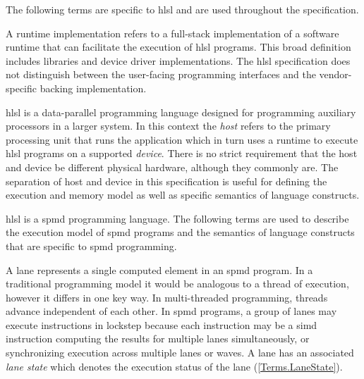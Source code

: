 
\p The following terms are specific to \acrshort{hlsl} and are used throughout
the specification.


\p A runtime implementation refers to a full-stack implementation of a software
runtime that can facilitate the execution of \acrshort{hlsl} programs. This
broad definition includes libraries and device driver implementations. The
\acrshort{hlsl} specification does not distinguish between the user-facing
programming interfaces and the vendor-specific backing implementation.


\p \acrshort{hlsl} is a data-parallel programming language designed for
programming auxiliary processors in a larger system. In this context the
\textit{host} refers to the primary processing unit that runs the application
which in turn uses a runtime to execute \acrshort{hlsl} programs on a supported
\textit{device}. There is no strict requirement that the host and device be
different physical hardware, although they commonly are. The separation of host
and device in this specification is useful for defining the execution and memory
model as well as specific semantics of language constructs.


\p \acrshort{hlsl} is a \acrfull{spmd} programming language. The following terms
are used to describe the execution model of \acrshort{spmd} programs and the
semantics of language constructs that are specific to \acrshort{spmd}
programming.


\p A \gls{lane} represents a single computed element in an \acrshort{spmd}
program. In a traditional programming model it would be analogous to a thread of
execution, however it differs in one key way. In multi-threaded programming,
threads advance independent of each other. In \acrshort{spmd} programs, a group
of \gls{lane}s may execute instructions in lockstep because each instruction may
be a \acrshort{simd} instruction computing the results for multiple \gls{lane}s
simultaneously, or synchronizing execution across multiple \gls{lane}s or
\gls{wave}s. A \gls{lane} has an associated \textit{lane state} which denotes
the execution status of the lane (\ref{Terms.LaneState}).

